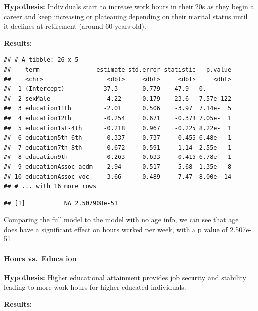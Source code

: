 \documentclass[]{article}
\newenvironment{Shaded}{\begin{snugshade}}{\end{snugshade}}
\newcommand{\KeywordTok}[1]{\textcolor[rgb]{0.13,0.29,0.53}{\textbf{#1}}}
\newcommand{\NormalTok}[1]{#1}
\newcommand{\OperatorTok}[1]{\textcolor[rgb]{0.81,0.36,0.00}{\textbf{#1}}}
\let\oldparagraph\paragraph
\renewcommand{\paragraph}[1]{\oldparagraph{#1}\mbox{}}
\begin{document}
\textbf{Hypothesis:} Individuals start to increase work hours in their
20s as they begin a career and keep increasing or plateauing depending
on their marital status until it declines at retirement (around 60 years
old).

\textbf{Results:}

\begin{verbatim}
## # A tibble: 26 x 5
##    term                estimate std.error statistic   p.value
##    <chr>                  <dbl>     <dbl>     <dbl>     <dbl>
##  1 (Intercept)           37.3       0.779    47.9   0.       
##  2 sexMale                4.22      0.179    23.6   7.57e-122
##  3 education11th         -2.01      0.506    -3.97  7.14e-  5
##  4 education12th         -0.254     0.671    -0.378 7.05e-  1
##  5 education1st-4th      -0.218     0.967    -0.225 8.22e-  1
##  6 education5th-6th       0.337     0.737     0.456 6.48e-  1
##  7 education7th-8th       0.672     0.591     1.14  2.55e-  1
##  8 education9th           0.263     0.633     0.416 6.78e-  1
##  9 educationAssoc-acdm    2.94      0.517     5.68  1.35e-  8
## 10 educationAssoc-voc     3.66      0.489     7.47  8.00e- 14
## # ... with 16 more rows
\end{verbatim}

\begin{Shaded}
\end{Shaded}

\begin{verbatim}
## [1]           NA 2.507908e-51
\end{verbatim}

Comparing the full model to the model with no age info, we can see that
age does have a significant effect on hours worked per week, with a p
value of 2.507e-51

\hypertarget{hours-vs.-education}{%
\paragraph{Hours vs.~Education}\label{hours-vs.-education}}

\textbf{Hypothesis:} Higher educational attainment provides job security
and stability leading to more work hours for higher educated
individuals.

\textbf{Results:}
\end{document}

